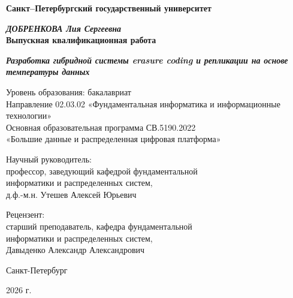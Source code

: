 
\begin{titlepage}
\begin{center}

\textbf{Санкт--Петербургский государственный университет}

\vspace{35mm}

\textbf{\textit{\large ДОБРЕНКОВА Лия Сергеевна}} \\[8mm]
\textbf{\large Выпускная квалификационная работа}\\[3mm]
\begin{minipage}{0.9\textwidth}
\centering
\textbf{\textit{\large Разработка гибридной системы erasure coding и репликации на основе температуры данных}}
\end{minipage}

\vspace{20mm}
Уровень образования: бакалавриат\\
Направление 02.03.02 «Фундаментальная информатика и информационные технологии»\\
Основная образовательная программа СВ.5190.2022\\
«Большие данные и распределенная цифровая платформа»\\[25mm]

\begin{flushright}
\begin{minipage}[t]{0.70\textwidth}
{Научный руководитель:}\\
профессор, заведующий кафедрой фундаментальной\\
информатики и распределенных систем,\\
д.ф.-м.н. Утешев Алексей Юрьевич

\vspace{10mm}

{Рецензент:}\\
старший преподаватель, кафедра фундаментальной\\
информатики и распределенных систем,\\
Давыденко Александр Александрович
\end{minipage}
\end{flushright}

\vfill

{Санкт-Петербург}\\
\par{2026 г.}
\end{center}
\end{titlepage}

\restoregeometry
\addtocounter{page}{1}
